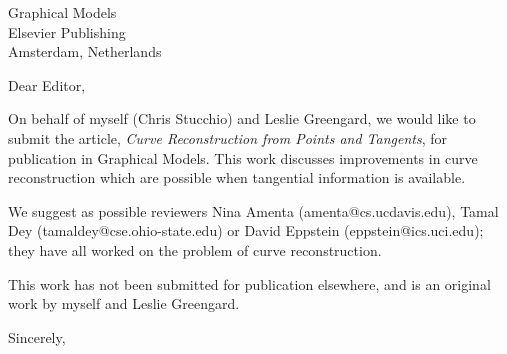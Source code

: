 \documentclass{letter}
\begin{document}
\begin{letter}{Graphical Models \\ Elsevier Publishing\\Amsterdam, Netherlands}
  \opening{Dear Editor,}

  On behalf of myself (Chris Stucchio) and Leslie Greengard, we would like to submit the article, \emph{Curve Reconstruction from Points and Tangents}, for publication in Graphical Models. This work discusses improvements in curve reconstruction which are possible when  tangential information is available.

  We suggest as possible reviewers Nina Amenta (amenta@cs.ucdavis.edu), Tamal Dey (tamaldey@cse.ohio-state.edu) or David Eppstein (eppstein@ics.uci.edu); they have all worked on the problem of curve reconstruction.

  This work has not been submitted for publication elsewhere, and is an original work by myself and Leslie Greengard.

  \closing{Sincerely,}

\end{letter}
\end{document}

